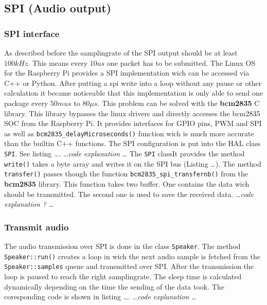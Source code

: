 \subsection{SPI (Audio output)}

\subsubsection*{SPI interface}

As described before the samplingrate of the SPI output should be at least $100kHz$. This means every $10us$ one packet has to be submitted. The Linux OS for the Raspberry Pi provides a SPI implementation wich can be accessed via C++ or Python. After putting a spi write into a loop without any pause or other calculation it became noticeable that this implementation is only able to send one package every $50mu s$ to $80\mu s$. This problem can be solved with the \textbf{bcm2835} C library. This library bypasses the linux drivers and directly accesses the bcm2835 SOC from the Raspberry Pi. It provides interfaces for GPIO pins, PWM and SPI as well as \lstinline{bcm2835_delayMicroseconds()} function wich is much more accurate than the builtin C++ functions.\p
%
The SPI configuration is put into the HAL class \lstinline{SPI}. See listing \dots.\p
\dots \textit{code explanation} \dots\p
%
The \lstinline{SPI} classIt provides the method \lstinline{write()} takes a byte array and writes it on the SPI bus (Listing \dots). The method \lstinline{transfer()} passes though the function \lstinline{bcm2835_spi_transfernb()} from the \textbf{bcm2835} library. This function takes two buffer. One contains the data wich should be transmitted. The second one is used to save the received data.\p
\dots \textit{code explanation ?} \dots\p

\subsubsection*{Transmit audio}

The audio transmission over SPI is done in the class \lstinline{Speaker}. The method \lstinline{Speaker::run()} creates a loop in wich the next audio sample is fetched from the \lstinline{Speaker::samples} queue and transmitted over SPI. After the transmission the loop is paused to reach the right samplingrate. The sleep time is calculated dynamically depending on the time the sending of the data took. The coresponding code is shown in listing \dots.\p
\dots \textit{code explanation} \dots\p

